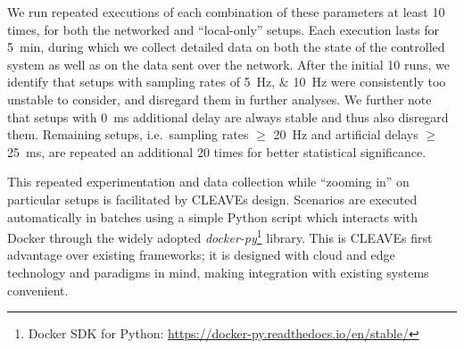 We run repeated executions of each combination of these parameters at least \num{10} times, for both the networked and ``local-only'' setups.
Each execution lasts for \SI{5}{\minute}, during which we collect detailed data on both the state of the controlled system as well as on the data sent over the network.
After the initial \num{10} runs, we identify that setups with sampling rates of \SIlist{5;10}{\hertz} were consistently too unstable to consider, and disregard them in further analyses.
We further note that setups with \SI{0}{\milli\second} additional delay are always stable and thus also disregard them.
Remaining setups, i.e.\ sampling rates \( \geq \) \SI{20}{\hertz} and artificial delays \( \geq \) \SI{25}{\milli\second}, are repeated an additional \num{20} times for better statistical significance.

This repeated experimentation and data collection while ``zooming in'' on particular setups is facilitated by \gls{CLEAVE}s design.
Scenarios are executed automatically in batches using a simple Python script which interacts with Docker through the widely adopted \emph{docker-py}\footnote{Docker SDK for Python: \url{https://docker-py.readthedocs.io/en/stable/}} library.
This is \gls{CLEAVE}s first advantage over existing frameworks;
it is designed with cloud and edge technology and paradigms in mind, making integration with existing systems convenient.

